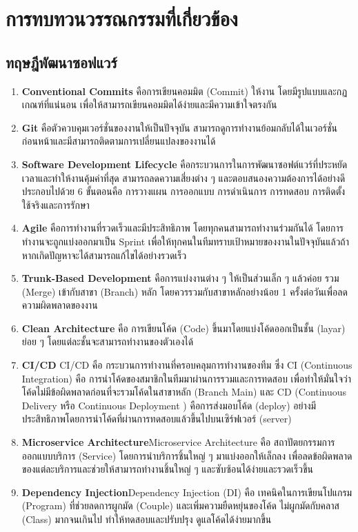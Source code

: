 \chapter{การทบทวนวรรณกรรมที่เกี่ยวข้อง}
\label{chapter:literature-review}

\section{ทฤษฎีพัฒนาซอฟแวร์}

\begin{enumerate}
    \item \textbf{Conventional Commits} คือการเขียนคอมมิต (Commit) ให้งาน โดยมีรูปแบบและกฏเกณฑ์ที่แน่นอน เพื่อให้สามารถเขียนคอมมิตได้ง่ายและมีความเข้าใจตรงกัน \cite{CICDConventionalCommits}
    \item \textbf{Git} คือตัวควบคุมเวอร์ชั่นของงานให้เป็นปัจจุบัน สามารถดูการทำงานย้อมกลับได้ในเวอร์ชั่นก่อนหน้าและมีสามารถติดตามการเปลี่ยนแปลงของงานได้ \cite{BasicGit}
    \item \textbf{Software Development Lifecycle} คือกระบวนการในการพัฒนาซอฟต์แวร์ที่ประหยัดเวลาและทำให้งานคุ้มค่าที่สุด สามารถลดความเสี่ยงต่าง ๆ และตอบสนองความต้องการได้อย่างดี ประกอบไปด้วย 6 ขั้นตอนคือ การวางแผน การออกแบบ การดำเนินการ การทดสอบ การติดตั้งใช้จริงและการรักษา \cite{WhatIsSDLC}
    \item \textbf{Agile} คือการทำงานที่รวดเร็วและมีประสิทธิภาพ โดยทุกคนสามารถทำงานร่วมกันได้ โดยการทำงานจะถูกแบ่งออกมาเป็น Sprint เพื่อให้ทุกคนในทีมทราบเป้าหมายของงานในปัจจุบันแล้วถ้าหากเกิดปัญหาจะได้สามารถแก้ไขได้อย่างรวดเร็ว \cite{WhatIsAgile}
    \item \textbf{Trunk-Based Development} คือการแบ่งงานต่าง ๆ ให้เป็นส่วนเล็ก ๆ แล้วค่อย รวม (Merge) เข้ากับสาขา (Branch) หลัก โดยควรรวมกับสาขาหลักอย่างน้อย 1 ครั้งต่อวันเพื่อลดความผิดพลาดของงาน \cite{TrunkBasedDevelopment}
    \item \textbf{Clean Architecture} คือ การเขียนโค้ด (Code) ขึ้นมาโดยแบ่งโค้ดออกเป็นชั้น (layar) ย่อย ๆ โดยแต่ละชั้นจะสามารถทำงานของตัวเองได้ 
    \item \textbf{CI/CD} CI/CD คือ กระบวนการทำงานที่ครอบคลุมการทำงานของทีม ซึ่ง CI (Continuous Integration) คือ การนำโค้ดของสมาชิกในทีมมาผ่านการรวมและการทดสอบ เพื่อทำให้มั่นใจว่าโค้ดไม่มีข้อผิดพลาดก่อนที่จะรวมโค้ดในสาขาหลัก (Branch Main) และ CD (Continuous Delivery หรือ Continuous Deployment ) คือการส่งมอบโค้ด (deploy) อย่างมีประสิทธิภาพโดยการนำโค้ดที่ผ่านการทดสอบแล้วขึ้นไปบนเซิร์ฟเวอร์ (server)
    \item \textbf{Microservice Architecture}Microservice Architecture คือ สถาปัตยกรรมการออกแบบบริการ (Service) โดยการนำบริการชิ้นใหญ่ ๆ มาแบ่งออกให้เล็กลง เพื่อลดข้อผิดพลาดของแต่ละบริการและช่วยให้สามารถทำงานชิ้นใหญ่ ๆ และซับซ้อนได้ง่ายและรวดเร็วขึ้น
    \item \textbf{Dependency Injection}Dependency Injection (DI) คือ เทคนิคในการเขียนโปแกรม (Program) ที่ช่วยลดการผูกมัด (Couple) และเพิ่มความยืดหยุ่นของโค้ด ไม่ผูกมัดกับคลาส (Class) มากจนเกินไป ทำให้ทดสอบและปรับปรุง ดูแลโค้ดได้ง่ายมากขึ้น
\end{enumerate}

